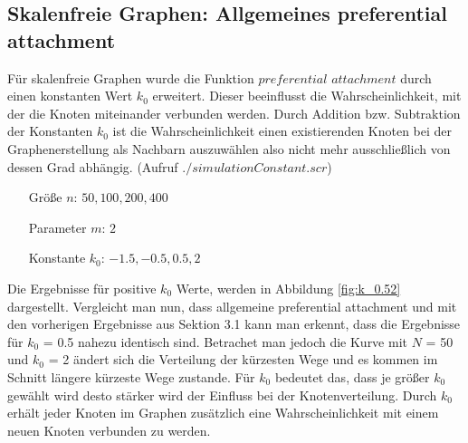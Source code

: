 \documentclass[10pt]{article}
\begin{document}
\subsection{Skalenfreie Graphen: Allgemeines preferential attachment}
Für skalenfreie Graphen wurde die Funktion $preferential$ $attachment$ durch einen konstanten Wert $k_0$ erweitert. Dieser beeinflusst die Wahrscheinlichkeit, mit der die Knoten miteinander verbunden werden. Durch Addition bzw. Subtraktion der Konstanten $k_0$ ist die Wahrscheinlichkeit einen existierenden Knoten bei der Graphenerstellung als Nachbarn auszuwählen also nicht mehr ausschließlich von dessen Grad abhängig. (Aufruf $./simulationConstant.scr$) 

\begin{itemize}
\item[\quad Größe $n$:] $50,100,200,400$
\item[\quad Parameter $m$:] $2$
\item[\quad Konstante $k_0$:] $-1.5,-0.5,0.5,2$
\end{itemize}

Die Ergebnisse für positive $k_0$ Werte, werden in Abbildung \ref{fig:k_0.52} dargestellt. Vergleicht man nun, dass allgemeine preferential attachment und mit den vorherigen Ergebnisse aus Sektion 3.1 kann man erkennt, dass die Ergebnisse für $k_0$ = 0.5 nahezu identisch sind. Betrachet man jedoch die Kurve mit $N$ = 50 und $k_0$ = 2 ändert sich die Verteilung der kürzesten Wege und es kommen im Schnitt längere kürzeste Wege zustande. Für $k_0$ bedeutet das, dass je größer $k_0$ gewählt wird desto stärker wird der Einfluss bei der Knotenverteilung. Durch $k_0$ erhält jeder Knoten im Graphen zusätzlich eine Wahrscheinlichkeit mit einem neuen Knoten verbunden zu werden.
\end{document}
